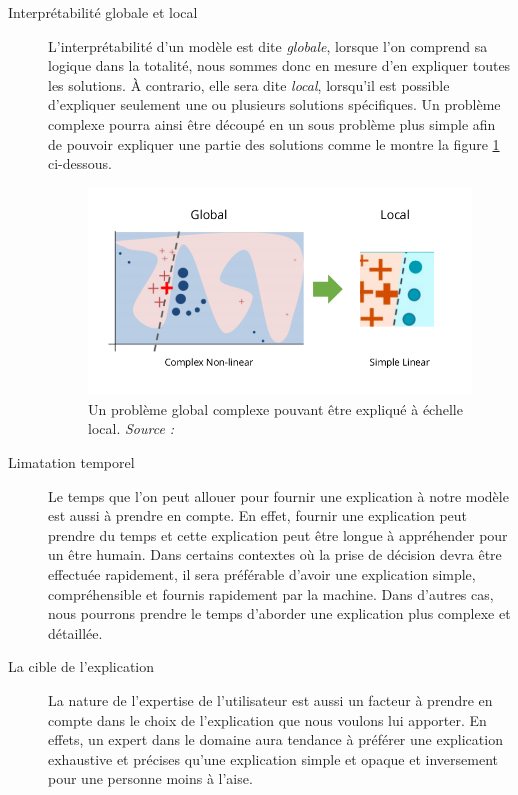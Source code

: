 \begin{description}
\item[Interprétabilité globale et local] L'interprétabilité d'un modèle est dite \textit{globale}, lorsque l'on comprend sa logique dans la totalité, nous sommes donc en mesure d'en expliquer toutes les solutions. À contrario, elle sera dite \textit{local}, lorsqu'il est possible d'expliquer seulement une ou plusieurs solutions spécifiques. Un problème complexe pourra ainsi être découpé en un sous problème plus simple afin de pouvoir expliquer une partie des solutions comme le montre la figure \ref{globalVSlocal} ci-dessous.
\begin{figure}[h]
\centering
\includegraphics[scale=0.4]{src_img/globalVSlocal.png}
\caption{Un problème global complexe pouvant être expliqué à échelle local. \textit{Source : \cite{limePaper}}}
\label{globalVSlocal}
\end{figure}

\item[Limatation temporel] Le temps que l'on peut allouer pour fournir une explication à notre modèle est aussi à prendre en compte. En effet, fournir une explication peut prendre du temps et cette explication peut être longue à appréhender pour un être humain. Dans certains contextes où la prise de décision devra être effectuée rapidement, il sera préférable d'avoir une explication simple, compréhensible et fournis rapidement par la machine. Dans d'autres cas, nous pourrons prendre le temps d'aborder une explication plus complexe et détaillée.

\item[La cible de l'explication] La nature de l'expertise de l'utilisateur est aussi un facteur à prendre en compte dans le choix de l'explication que nous voulons lui apporter. En effets, un expert dans le domaine aura tendance à préférer une explication exhaustive et précises qu'une explication simple et opaque et inversement pour une personne moins à l'aise.
\end{description}

